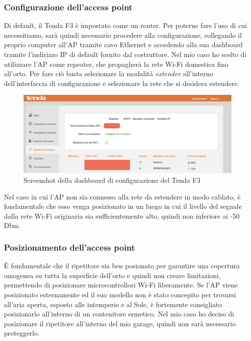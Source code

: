 \documentclass[11pt, a4paper]{article}
\begin{document}
\subsubsection{Configurazione dell'access point}
Di default, il Tenda F3 è impostato come un router. Per poterne fare l'uso di cui
necessitiamo, sarà quindi necessario procedere alla configurazione, collegando
il proprio computer all'AP tramite cavo Ethernet e accedendo alla sua dashboard
tramite l'indirizzo IP di default fornito dal costruttore.
Nel mio caso ho scelto di utilizzare l'AP come repeater, che propagherà la rete Wi-Fi
domestica fino all'orto.
Per fare ciò basta selezionare la modalità \textit{extender} all'interno
dell'interfaccia di configurazione e selezionare la rete che si desidera estendere.
\begin{figure}[h!]
    \centering
    \includegraphics[width=1\textwidth]{media/dashboard-tenda-f3.png}
    \caption{Screenshot della dashboard di configurazione del Tenda F3}
    \label{fig:tenda-f3-dashboard}
\end{figure}
Nel caso in cui l'AP non sia connesso alla rete da estendere in modo cablato, è fondamentale
che esso venga posizionato in un luogo in cui il livello del segnale dalla rete Wi-Fi originaria 
sia sufficientemente alto, quindi non inferiore ai -50 Dbm.

\subsubsection{Posizionamento dell'access point}
È fondamentale che il ripetitore sia ben posionato per garantire una copertura omogenea
su tutta la superficie dell'orto e quindi non creare limitazioni, permettendo di posizionare
microcontrollori Wi-Fi liberamente. Se l'AP viene posizionato esternamente ed
il suo modello non è stato concepito per trovarsi all'aria aperta, esposto
alle intemperie e al Sole, è fortemente consigliato posizionarlo all'interno di un
contenitore ermetico.
Nel mio caso ho deciso di posizionare il ripetitore all'interno del mio garage,
quindi non sarà necessario proteggerlo.
\end{document}
